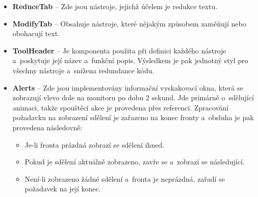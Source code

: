 \begin{itemize}
    \item \textbf{ReduceTab} -- Zde jsou nástroje, jejichž účelem je redukce textu.
    \item \textbf{ModifyTab} -- Obsahuje nástroje, které nějakým způsobem zaměňují nebo obohacují text.
    \item \textbf{ToolHeader} -- Je komponenta použita při definici každého nástroje a~poskytuje její název a~funkční popis. Výsledkem je pak jednotný styl pro všechny nástroje a~snížena redundance kódu.
    \item \textbf{Alerts} -- Zde jsou implementovány informační vyskakovací okna, která se zobrazují vlevo dole na monitoru po dobu 2 sekund. Jde primárně o~sdělující animaci, takže spouštěcí akce je provedena přes referenci. Zpracování požadavku na zobrazení sdělení je zařazeno na konec fronty a~obsluha je pak provedena následovně:
    \begin{itemize}
        \item Je-li fronta prázdná zobrazí se sdělení ihned.
        \item Pokud je sdělení aktuálně zobrazeno, zavře se a~zobrazí se následující.
        \item Není-li zobrazeno žádné sdělení a~fronta je neprázdná, zařadí se požadavek na její konec.
    \end{itemize}
\end{itemize}

